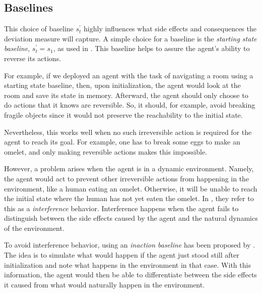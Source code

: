 \documentclass[12pt,A4]{report}
\newcommand{\autobaj}{}
\theoremstyle{definition}
\begin{document}

\subsection{Baselines}
This choice of baseline $s^\prime_t$ highly influences what side effects and consequences the deviation measure will capture. A simple choice for a baseline is the \textit{starting state baseline}, $s^{\prime}_t = s_1$, as used in \citet{Eysenbach}. This baseline helps to assure the agent's ability to reverse its actions. 

For example, if we deployed an agent with the task of navigating a room using a starting state baseline, then, upon initialization, the agent would look at the room and save its state in memory. Afterward, the agent should only choose to do actions that it knows are reversible. So, it should, for example, avoid breaking fragile objects since it would not preserve the reachability to the initial state. 

Nevertheless, this works well when no such irreversible action is required for the agent to reach its goal. For example, one has to break some eggs to make an omelet, and only making reversible actions makes this impossible. 

However, a problem arises when the agent is in a dynamic environment. Namely, the agent would act to prevent other irreversible actions from happening in the environment, like a human eating an omelet. Otherwise, it will be unable to reach the initial state where the human has not yet eaten the omelet. In \citet{Krakovna19}, they refer to this as a \textit{interference} behavior. Interference happens when the agent fails to distinguish between the side effects caused by the agent and the natural dynamics of the environment. 

To avoid interference behavior, using an \textit{inaction baseline} has been proposed by \citet{Krakovna19}. The idea is to simulate what would happen if the agent just stood still after initialization and note what happens in the environment in that case. With this information, the agent would then be able to differentiate between the side effects it caused from what would naturally happen in the environment. 
\end{document}
